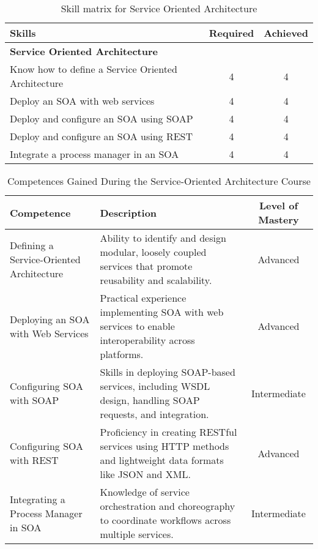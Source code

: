 \begin{table}[h!]
    \centering
    \renewcommand{\arraystretch}{1.5} %
    \begin{tabular}{|p{11cm}|c|c|}
    \hline
    \rowcolor[gray]{0.8}
    \textbf{Skills} & \textbf{Required} & \textbf{Achieved} \\ \hline
    \rowcolor[gray]{0.9} \textbf{Service Oriented Architecture} &  &  \\ \hline
    Know how to define a Service Oriented Architecture & 4 & 4 \\ \hline
    Deploy an SOA with web services & 4 & 4 \\ \hline
    Deploy and configure an SOA using SOAP & 4 & 4 \\ \hline
    Deploy and configure an SOA using REST & 4 & 4 \\ \hline
    Integrate a process manager in an SOA & 4 & 4 \\ \hline
    \end{tabular}
    \caption{Skill matrix for Service Oriented Architecture}
    \label{table:skills-soa}
\end{table}

\begin{table}[H]
    \centering
    \renewcommand{\arraystretch}{1.5} %
    \begin{tabular}{|p{3.5cm}|p{8cm}|c|}
    \hline
    \rowcolor[gray]{0.8}
    \textbf{Competence} & \textbf{Description} & \textbf{Level of Mastery} \\ \hline
    Defining a Service-Oriented Architecture & Ability to identify and design modular, loosely coupled services that promote reusability and scalability. & Advanced \\ \hline
    Deploying an SOA with Web Services       & Practical experience implementing SOA with web services to enable interoperability across platforms. & Advanced \\ \hline
    Configuring SOA with SOAP                & Skills in deploying SOAP-based services, including WSDL design, handling SOAP requests, and integration. & Intermediate \\ \hline
    Configuring SOA with REST                & Proficiency in creating RESTful services using HTTP methods and lightweight data formats like JSON and XML. & Advanced \\ \hline
    Integrating a Process Manager in SOA     & Knowledge of service orchestration and choreography to coordinate workflows across multiple services. & Intermediate \\ \hline
    \end{tabular}
    \caption{Competences Gained During the Service-Oriented Architecture Course}
\end{table}

